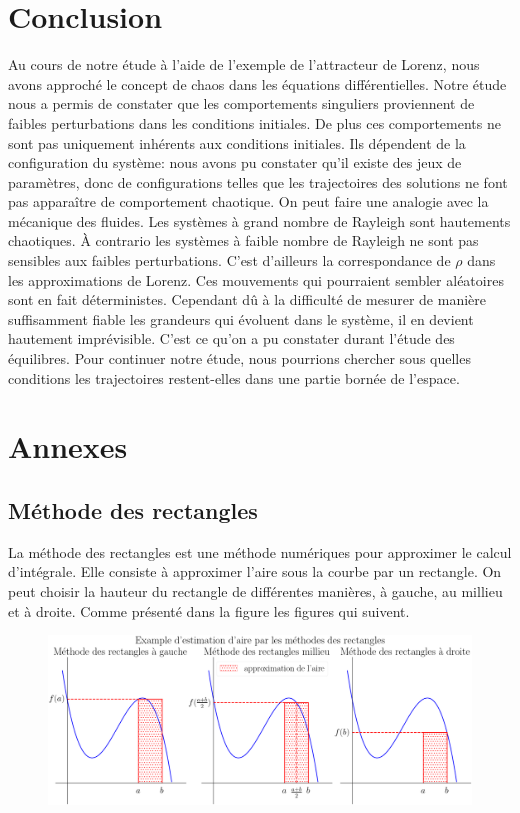 \documentclass{article}
\newtheorem[M , nocut]{prop}{Proposition}[section]
\newtheorem[M , nocut]{definition}{Définition}
\newtheorem[M , nocut]{lemme}{Lemme}
\newtheorem[L , nocut]{thm}{Théoreme}
\newtheorem[M , nocut]{cor}{Corollaire}
\begin{document}
\newpage
\section{Conclusion}

Au cours de notre étude à l'aide de l'exemple de l'attracteur de Lorenz, nous avons approché le concept de chaos dans les équations différentielles. Notre étude nous a permis de constater que les comportements singuliers proviennent de faibles perturbations dans les conditions initiales. De plus ces comportements ne sont pas uniquement inhérents aux conditions initiales. Ils dépendent de la configuration du système: nous avons pu constater qu'il existe des jeux de paramètres, donc de configurations telles que les trajectoires des solutions ne font pas apparaître de comportement chaotique. On peut faire une analogie avec la mécanique des fluides. Les systèmes à grand nombre de Rayleigh sont hautements chaotiques. \`A contrario les systèmes à faible nombre de Rayleigh ne sont pas sensibles aux faibles perturbations. C'est d'ailleurs la correspondance de $\rho$ dans les approximations de Lorenz. Ces mouvements qui pourraient sembler aléatoires sont en fait déterministes. Cependant dû à la difficulté de mesurer de manière suffisamment fiable les grandeurs qui évoluent dans le système, il en devient hautement imprévisible. C'est ce qu'on a pu constater durant l'étude des équilibres.
Pour continuer notre étude, nous pourrions chercher sous quelles conditions les trajectoires restent-elles dans une partie bornée de l'espace.
\newpage
\section{Annexes}
\subsection*{Méthode des rectangles}
La méthode des rectangles est une méthode numériques pour approximer le calcul d'intégrale. Elle consiste à approximer l'aire sous la courbe par un rectangle. On peut choisir la hauteur du rectangle de différentes manières, à gauche, au millieu et à droite. Comme présenté dans la figure les figures qui suivent.
\begin{figure}[ht]
    \includegraphics[width=\textwidth]{MethodeRect}
\end{figure}
\end{document}
